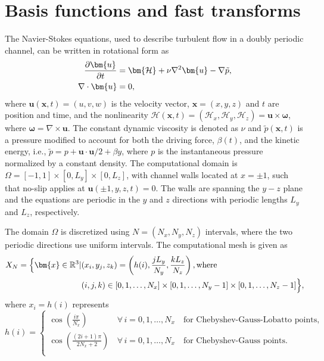 \documentclass[preprint]{elsarticle}
\begin{document}
\section{Basis functions and fast transforms}
\label{sec:prelim}
The Navier-Stokes equations, used to describe turbulent flow in a doubly 
periodic channel, can be written in rotational form as
\begin{align}
 \frac{\partial \bm{u}}{\partial t}   &= \bm{\mathcal{H}} + \nu 
 \nabla^2 \bm{u} - \nabla{\tilde{p}}, \notag \\
 \nabla \cdot \bm{u} &= 0, \label{eq:NS}
\end{align}
where $\bm{u}(\bm{x}, t)=(u, v, w)$ is the velocity vector, $\bm{x}=(x, y, z)$ 
and $t$ are position and time, and the nonlinearity $\bm{\mathcal{H}}(\bm{x}, t) = (\mathcal{H}_x, \mathcal{H}_y, \mathcal{H}_z) = \bm{u}\times 
\bm{\omega}$, where $\bm{\omega} = \nabla \times \bm{u}$.  The constant dynamic viscosity is denoted as $\nu$ 
and $\tilde{p}(\bm{x}, t)$ is a pressure modified to account for both the driving force, $\beta(t)$, and the kinetic energy, i.e., $\tilde{p} = p + \bm{u} \cdot \bm{u}/2 + \beta y$, where $p$ is the instantaneous 
pressure normalized by a constant density. The computational domain is 
$\Omega=[-1, 1]\times [0, L_y] \times [0, L_z]$, with channel walls 
located at $x=\pm 1$, such that no-slip applies at 
$ \bm{u}(\pm 1, y, z, t) = 0$. The walls are spanning 
the $y-z$ plane and the equations are periodic in the $y$ and $z$ directions with periodic lengths $L_y$ and $L_z$, respectively.

The domain $\Omega$ is discretized using $N = (N_x, N_y, N_z)$ intervals, where the two periodic directions use uniform intervals. The computational mesh is given as
\begin{align}
X_N = \Big\{ \bm{x} \in \mathbb{R}^3 | &(x_i, y_j, z_k) = \left( h(i), \frac{jL_y}{N_y}, \frac{kL_z}{N_z} \right), \text{where} \notag \\
&(i, j, k) \in [0, 1, \ldots, N_x] \times [0, 1, \ldots, N_y-1] \times [0, 1, \ldots, N_z-1] \Big\}, \label{eq:Xn}
\end{align}
where $x_i = h(i)$ represents
\begin{equation}
h(i) = \begin{cases}
\cos \left(\frac{i \pi }{N_x} \right) \, &\forall \, i=0,1, \ldots, N_x \quad  \text{for Chebyshev-Gauss-Lobatto points}, \\
\cos \left(\frac{(2i +1)\pi}{2N_x+2} \right) \, &\forall \, i=0,1, \ldots, N_x \quad  \text{for Chebyshev-Gauss points}. \\
\end{cases}
\end{equation}
\end{document}
